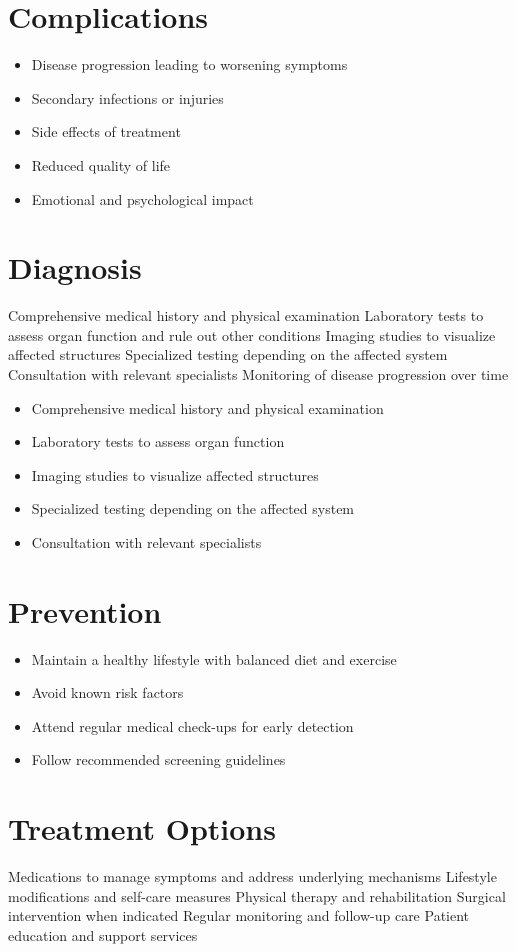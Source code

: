 \section{Complications}
\begin{itemize}[noitemsep]
  \item Disease progression leading to worsening symptoms
  \item Secondary infections or injuries
  \item Side effects of treatment
  \item Reduced quality of life
  \item Emotional and psychological impact
\end{itemize}
\section{Diagnosis}
Comprehensive medical history and physical examination Laboratory tests to assess organ function and rule out other conditions Imaging studies to visualize affected structures Specialized testing depending on the affected system Consultation with relevant specialists Monitoring of disease progression over time

\begin{itemize}[noitemsep]
  \item Comprehensive medical history and physical examination
  \item Laboratory tests to assess organ function
  \item Imaging studies to visualize affected structures
  \item Specialized testing depending on the affected system
  \item Consultation with relevant specialists
\end{itemize}
\section{Prevention}
\begin{itemize}[noitemsep]
  \item Maintain a healthy lifestyle with balanced diet and exercise
  \item Avoid known risk factors
  \item Attend regular medical check-ups for early detection
  \item Follow recommended screening guidelines
\end{itemize}
\section{Treatment Options}
Medications to manage symptoms and address underlying mechanisms Lifestyle modifications and self-care measures Physical therapy and rehabilitation Surgical intervention when indicated Regular monitoring and follow-up care Patient education and support services

